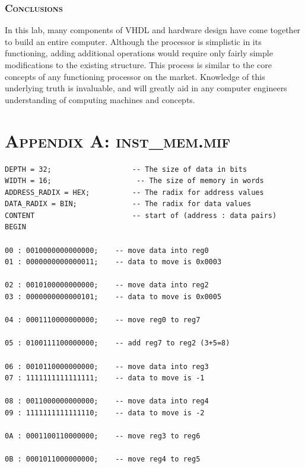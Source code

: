 \documentclass[11pt]{report}
\begin{document}
\begin{spacing}{1.5}
\subsection{\scshape Conclusions}

In this lab, many components of VHDL and hardware design have come together to build an entire computer.  Although the processor is simplistic in its functioning, adding additional operations would require only fairly simple modifications to the existing structure.  This process is similar to the core concepts of any functioning processor on the market.  Knowledge of this underlying truth is invaluable, and will greatly aid in any computer engineers understanding of computing machines and concepts.


\clearpage


{}


\chapter*{\scshape Appendix A: inst\_mem.mif}
\label{app:a}
\vspace{15px}
\begin{lstlisting}
DEPTH = 32;                   -- The size of data in bits
WIDTH = 16;                    -- The size of memory in words
ADDRESS_RADIX = HEX;          -- The radix for address values
DATA_RADIX = BIN;             -- The radix for data values
CONTENT                       -- start of (address : data pairs)
BEGIN

00 : 0010000000000000;    -- move data into reg0
01 : 0000000000000011;    -- data to move is 0x0003

02 : 0010100000000000;    -- move data into reg2
03 : 0000000000000101;    -- data to move is 0x0005

04 : 0001110000000000;    -- move reg0 to reg7

05 : 0100111100000000;    -- add reg7 to reg2 (3+5=8)

06 : 0010110000000000;    -- move data into reg3
07 : 1111111111111111;    -- data to move is -1

08 : 0011000000000000;    -- move data into reg4
09 : 1111111111111110;    -- data to move is -2

0A : 0001100110000000;    -- move reg3 to reg6

0B : 0001011000000000;    -- move reg4 to reg5


\end{lstlisting}
\end{spacing}
\end{document}
